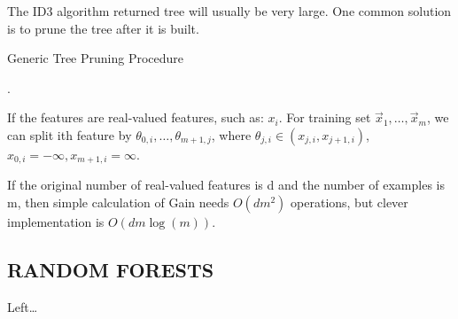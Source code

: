 The ID3 algorithm returned tree will usually be very large. One common solution is to prune the tree after it is built.

\begin{algorithm}[H]
    \caption{Generic Tree Pruning Procedure}
    \begin{algorithmic}
        \EndFor.
    \end{algorithmic}
\end{algorithm}

If the features are real-valued features, such as: $ x_i $. For training set $ \vec{x}_1, \ldots, \vec{x}_m $, we can split ith feature by $ \theta_{0,i}, \ldots, \theta_{m+1, j} $, where $ \theta_{j, i} \in (x_{j, i}, x_{j+1, i}) $, $ x_{0,i} = -\infty, x_{m+1, i} = \infty $.

If the original number of real-valued features is d and the number of examples is m, then simple calculation of Gain needs $ O(dm^2) $ operations, but clever implementation is $ O(dm \log(m)) $.

\subsection{RANDOM FORESTS}%
Left\ldots

